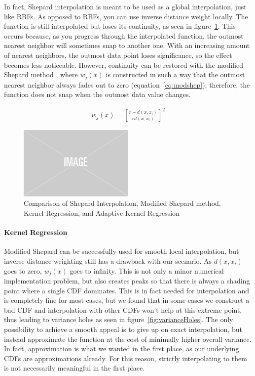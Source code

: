 In fact, Shepard interpolation is meant to be used as a global interpolation, just like RBFs.  As opposed to RBFs, you can use inverse distance weight locally. The function is still interpolated but loses its continuity, as seen in figure~\ref{fig:shepmodshepkradkreg}. This occurs because, as you progress through the interpolated function, the outmost nearest neighbor will sometimes snap to another one. With an increasing amount of nearest neighbors, the outmost data point loses significance, so the effect becomes less noticeable. However, continuity can be restored with the modified Shepard method \parencite{franke1980smooth, DBLP:conf/siggraph/AnjyoLP14}, where $w_j(x)$ is constructed in such a way that the outmost nearest neighbor always fades out to zero (equation~\ref{eq:modshep}); therefore, the function does not snap when the outmost data value changes.

\begin{align}\label{eq:modshep}
w_j(x) = \left[ \frac{ r - d(x, x_i)}{ rd(x, x_i) } \right]^2
\end{align}

\begin{figure}
    \centering
    \includegraphics[width=0.5\textwidth]{figures/img-placeholder.png}
    \caption{Comparison of Shepard Interpolation, Modified Shepard method, Kernel Regression, and Adaptive Kernel Regression}
    \label{fig:shepmodshepkradkreg}
\end{figure}


\paragraph{Kernel Regression}

Modified Shepard can be successfully used for smooth local interpolation, but inverse distance weighting still has a drawback with our scenario. As $d(x, x_i)$ goes to zero, $w_j(x)$ goes to infinity. This is not only a minor numerical implementation problem, but also creates peaks so that there is always a shading point where a single CDF dominates. This is in fact needed for interpolation and is completely fine for most cases, but we found that in some cases we construct a bad CDF and interpolation with other CDFs won't help at this extreme point, thus leading to variance holes as seen in figure~\ref{fig:varianceHoles}. The only possibility to achieve a smooth appeal is to give up on exact interpolation, but instead approximate the function at the cost of minimally higher overall variance. In fact, approximation is what we wanted in the first place, as our underlying CDFs are approximations already. For this reason, strictly interpolating to them is not necessarily meaningful in the first place.

